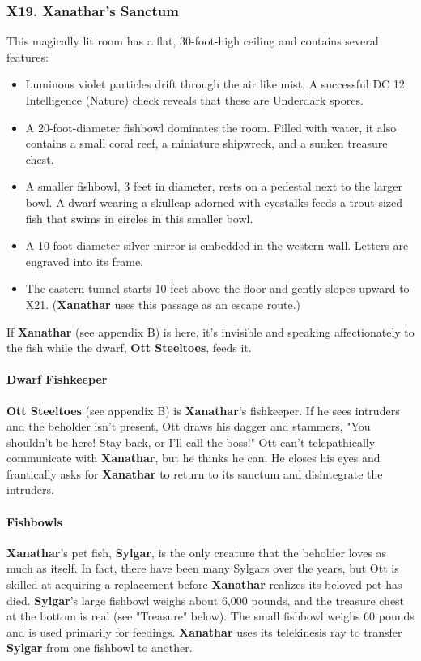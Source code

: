 \documentclass[10pt,a4paper,twoside,twocolumn,openany,nodeprecatedcode]{dndbook}
\begin{document}
\subsubsection{X19. Xanathar's Sanctum}
This magically lit room has a flat, 30-foot-high ceiling and contains several features:
\begin{itemize}

\item Luminous violet particles drift through the air like mist. A successful DC 12 Intelligence (Nature) check reveals that these are Underdark spores.
\item A 20-foot-diameter fishbowl dominates the room. Filled with water, it also contains a small coral reef, a miniature shipwreck, and a sunken treasure chest.
\item A smaller fishbowl, 3 feet in diameter, rests on a pedestal next to the larger bowl. A dwarf wearing a skullcap adorned with eyestalks feeds a trout-sized fish that swims in circles in this smaller bowl.
\item A 10-foot-diameter silver mirror is embedded in the western wall. Letters are engraved into its frame.
\item The eastern tunnel starts 10 feet above the floor and gently slopes upward to X21. (\textbf{Xanathar} uses this passage as an escape route.)
\end{itemize}


If \textbf{Xanathar} (see appendix B) is here, it's invisible and speaking affectionately to the fish while the dwarf, \textbf{Ott Steeltoes}, feeds it.
\paragraph{Dwarf Fishkeeper}
\textbf{Ott Steeltoes} (see appendix B) is \textbf{Xanathar}'s fishkeeper. If he sees intruders and the beholder isn't present, Ott draws his dagger and stammers, "You shouldn't be here! Stay back, or I'll call the boss!" Ott can't telepathically communicate with \textbf{Xanathar}, but he thinks he can. He closes his eyes and frantically asks for \textbf{Xanathar} to return to its sanctum and disintegrate the intruders.
\paragraph{Fishbowls}
\textbf{Xanathar}'s pet fish, \textbf{Sylgar}, is the only creature that the beholder loves as much as itself. In fact, there have been many Sylgars over the years, but Ott is skilled at acquiring a replacement before \textbf{Xanathar} realizes its beloved pet has died.
\textbf{Sylgar}'s large fishbowl weighs about 6,000 pounds, and the treasure chest at the bottom is real (see "Treasure" below). The small fishbowl weighs 60 pounds and is used primarily for feedings. \textbf{Xanathar} uses its telekinesis ray to transfer \textbf{Sylgar} from one fishbowl to another.
\end{document}
